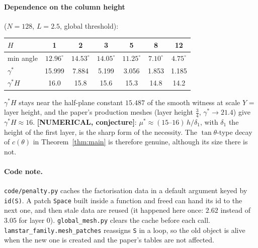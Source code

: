 \documentclass[11pt]{article}
\theoremstyle{remark}\newtheorem{remark}[theorem]{Remark}
\newcommand{\lab}[1]{\textbf{[#1]}}
\begin{document}
\paragraph{Dependence on the column height} ($N=128$, $L=2.5$, global threshold):
\begin{center}\small\begin{tabular}{lcccccc}
\toprule
$H$ & 1 & 2 & 3 & 5 & 8 & 12\\
\midrule
min angle & $12.96^\circ$ & $14.53^\circ$ & $14.05^\circ$ & $11.25^\circ$ & $7.10^\circ$ & $4.75^\circ$\\
$\gamma^\ast$ & 15.999 & 7.884 & 5.199 & 3.056 & 1.853 & 1.185\\
$\gamma^\ast H$ & 16.0 & 15.8 & 15.6 & 15.3 & 14.8 & 14.2\\
\bottomrule
\end{tabular}\end{center}
$\gamma^\ast H$ stays near the half-plane constant $15.487$ of the smooth witness at scale $Y$ = layer height, and the paper's
production meshes (layer height $\frac34$, $\gamma^\ast\to21.4$) give $\gamma^\ast H\approx16$. \lab{NUMERICAL, conjecture}:
$\mu^\ast\approx(15\text{--}16)\,h/\delta_1$, with $\delta_1$ the height of the first layer, is the sharp form of the
necessity. The $\tan\theta$-type decay of $c(\theta)$ in Theorem~\ref{thm:main} is therefore genuine, although its size
there is not.

\paragraph{Code note.} \texttt{code/penalty.py} caches the factorisation data in a default argument keyed by \texttt{id(S)}. A
patch \texttt{Space} built inside a function and freed can hand its id to the next one, and then stale data are reused (it
happened here once: $2.62$ instead of $3.05$ for layer 0). \texttt{global\_mesh.py} clears the cache before each call.
\texttt{lamstar\_family.mesh\_patches} reassigns \texttt{S} in a loop, so the old object is alive when the new one is created
and the paper's tables are not affected.
\end{document}
